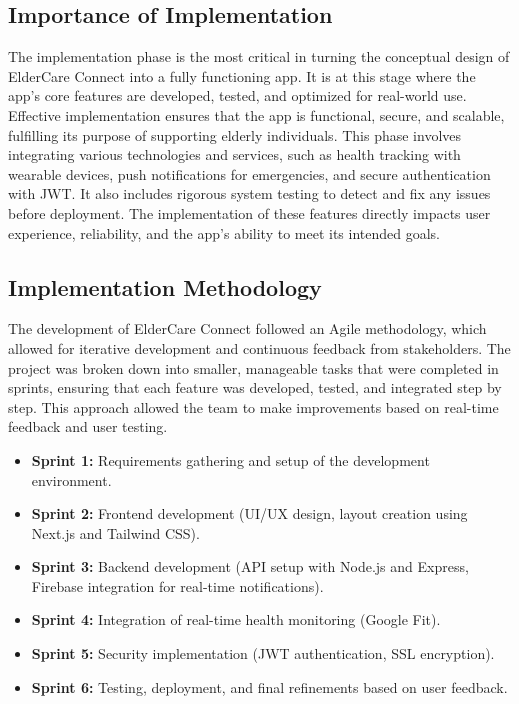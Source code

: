 \documentclass[a4paper, 12pt]{article}
\begin{document}
\subsection{Importance of Implementation}
The implementation phase is the most critical in turning the conceptual design of ElderCare Connect into a fully functioning app. It is at this stage where the app's core features are developed, tested, and optimized for real-world use. Effective implementation ensures that the app is functional, secure, and scalable, fulfilling its purpose of supporting elderly individuals.  
This phase involves integrating various technologies and services, such as health tracking with wearable devices, push notifications for emergencies, and secure authentication with JWT. It also includes rigorous system testing to detect and fix any issues before deployment. The implementation of these features directly impacts user experience, reliability, and the app's ability to meet its intended goals.

\subsection{Implementation Methodology}

The development of ElderCare Connect followed an Agile methodology, which allowed for iterative development and continuous feedback from stakeholders. The project was broken down into smaller, manageable tasks that were completed in sprints, ensuring that each feature was developed, tested, and integrated step by step. This approach allowed the team to make improvements based on real-time feedback and user testing.

\begin{itemize}
    \item \textbf{Sprint 1:} Requirements gathering and setup of the development environment.
    \item \textbf{Sprint 2:} Frontend development (UI/UX design, layout creation using Next.js and Tailwind CSS).
    \item \textbf{Sprint 3:} Backend development (API setup with Node.js and Express, Firebase integration for real-time notifications).
    \item \textbf{Sprint 4:} Integration of real-time health monitoring (Google Fit).
    \item \textbf{Sprint 5:} Security implementation (JWT authentication, SSL encryption).
    \item \textbf{Sprint 6:} Testing, deployment, and final refinements based on user feedback.
\end{itemize}
\end{document}
